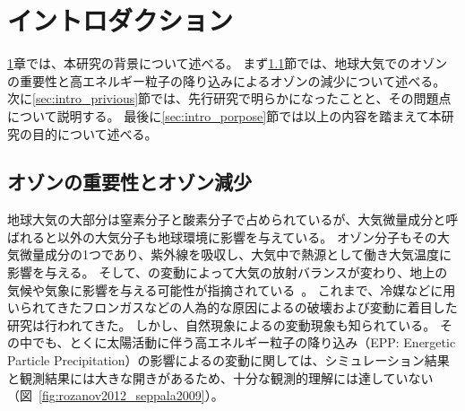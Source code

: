 \chapter{イントロダクション}
\label{ch:intro}
\ref{ch:intro}章では、本研究の背景について述べる。
まず\ref{sec:intro_background}節では、地球大気でのオゾンの重要性と高エネルギー粒子の降り込みによるオゾンの減少について述べる。
次に\ref{sec:intro_privious}節では、先行研究で明らかになったことと、その問題点について説明する。
最後に\ref{sec:intro_porpose}節では以上の内容を踏まえて本研究の目的について述べる。


\section{オゾンの重要性とオゾン減少}
\label{sec:intro_background}
地球大気の大部分は窒素分子と酸素分子で占められているが、大気微量成分と呼ばれると以外の大気分子も地球環境に影響を与えている。
オゾン分子もその大気微量成分の1つであり、紫外線を吸収し、大気中で熱源として働き大気温度に影響を与える。
そして、の変動によって大気の放射バランスが変わり、地上の気候や気象に影響を与える可能性が指摘されている~\cite{rozanov2012influence,seppala2009geomagnetic}。
これまで、冷媒などに用いられてきたフロンガスなどの人為的な原因によるの破壊および変動に着目した研究は行われてきた。
しかし、自然現象によるの変動現象も知られている。
その中でも、とくに太陽活動に伴う高エネルギー粒子の降り込み（EPP: Energetic Particle Precipitation）の影響によるの変動に関しては、シミュレーション結果と観測結果には大きな開きがあるため、十分な観測的理解には達していない（図~\ref{fig:rozanov2012_seppala2009}）。\par

